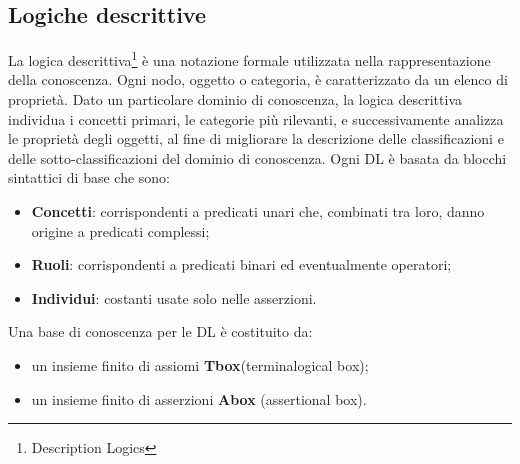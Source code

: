\documentclass[a4paper,11pt]{article}
\begin{document}
\newpage

\subsection{Logiche descrittive}
\label{sec:2.2}

La logica descrittiva\footnote{Description Logics} è una notazione formale utilizzata nella rappresentazione della conoscenza. Ogni nodo, oggetto o categoria, è caratterizzato da un elenco di proprietà.
Dato un particolare dominio di conoscenza, la logica descrittiva individua i concetti primari, le categorie più rilevanti, e successivamente analizza le proprietà degli oggetti, al fine di migliorare la descrizione delle classificazioni e delle sotto-classificazioni del dominio di conoscenza. Ogni DL è basata da blocchi sintattici di base che sono:
\begin{itemize}
\item \textbf{Concetti}: corrispondenti a predicati unari che, combinati tra loro, danno origine a predicati complessi; 
\item \textbf{Ruoli}: corrispondenti a predicati binari ed eventualmente operatori;
\item \textbf{Individui}: costanti usate solo nelle asserzioni.
\end{itemize}
Una base di conoscenza per le DL è costituito da:
\begin{itemize}
\item un insieme finito di assiomi \textbf{Tbox}(terminalogical box);
\item un insieme finito di asserzioni \textbf{Abox} (assertional box).
\end{itemize}
\end{document}
